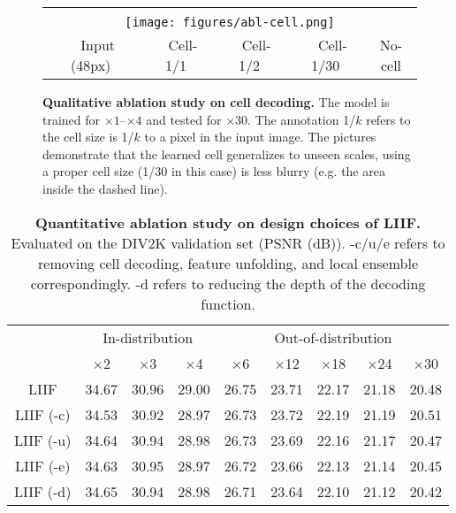 \documentclass[final]{cvpr}
\begin{document}
\begin{figure*}[]
    \centering
    \begin{tabular}{ccccc}
        \hspace{22mm} & \hspace{33mm} & \hspace{33mm} & \hspace{33mm} & \hspace{33mm} \\
        \multicolumn{5}{c}{\texttt{[image: figures/abl-cell.png]}} \\
        ~~Input (48px) & ~~Cell-1/1 & ~~Cell-1/2 & ~~Cell-1/30 & No-cell
    \end{tabular}
    \caption{\textbf{Qualitative ablation study on cell decoding.} The model is trained for $\times1$--$\times4$ and tested for $\times30$. The annotation 1/$k$ refers to the cell size is 1/$k$ to a pixel in the input image. The pictures demonstrate that the learned cell generalizes to unseen scales, using a proper cell size (1/30 in this case) is less blurry (e.g. the area inside the dashed line).}
    \label{fig:div2k-abl-cell}
\end{figure*}

\begin{table*}[]
    \centering
    \begin{tabular}{c|ccc|ccccc}
        & \multicolumn{3}{c|}{In-distribution} & \multicolumn{5}{c}{Out-of-distribution} \\
        & $\times$2 & $\times$3 & $\times$4 & $\times$6 & $\times$12 & $\times$18 & $\times$24 & $\times$30 \\
        \hline
        LIIF & 34.67 & 30.96 & 29.00 & 26.75 & 23.71 & 22.17 & 21.18 & 20.48 \\
        LIIF (-c) & 34.53 & 30.92 & 28.97 & 26.73 & 23.72 & 22.19 & 21.19 & 20.51 \\
        LIIF (-u) & 34.64 & 30.94 & 28.98 & 26.73 & 23.69 & 22.16 & 21.17 & 20.47 \\
        LIIF (-e) & 34.63 & 30.95 & 28.97 & 26.72 & 23.66 & 22.13 & 21.14 & 20.45 \\
        LIIF (-d) & 34.65 & 30.94 & 28.98 & 26.71 & 23.64 & 22.10 & 21.12 & 20.42 \\
    \end{tabular}
    \caption{\textbf{Quantitative ablation study on design choices of LIIF.} Evaluated on the DIV2K validation set (PSNR (dB)). -c/u/e refers to removing cell decoding, feature unfolding, and local ensemble correspondingly. -d refers to reducing the depth of the decoding function.}
    \label{tab:div2k-abl-all}
\end{table*}
\end{document}
